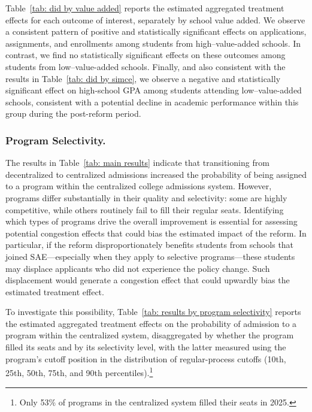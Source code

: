 \documentclass[11pt]{article}
\begin{document}
Table~\ref{tab: did by value added} reports the estimated aggregated treatment effects for each outcome of interest, separately by school value added. We observe a consistent pattern of positive and statistically significant effects on applications, assignments, and enrollments among students from high--value-added schools. In contrast, we find no statistically significant effects on these outcomes among students from low--value-added schools. Finally, and also consistent with the results in Table~\ref{tab: did by simce}, we observe a negative and statistically significant effect on high-school GPA among students attending low--value-added schools, consistent with a potential decline in academic performance within this group during the post-reform period.



\subsubsection{Program Selectivity.} 
The results in Table~\ref{tab: main results} indicate that transitioning from decentralized to centralized admissions increased the probability of being assigned to a program within the centralized college admissions system. However, programs differ substantially in their quality and selectivity: some are highly competitive, while others routinely fail to fill their regular seats. Identifying which types of programs drive the overall improvement is essential for assessing potential congestion effects that could bias the estimated impact of the reform. In particular, if the reform disproportionately benefits students from schools that joined SAE---especially when they apply to selective programs---these students may displace applicants who did not experience the policy change. Such displacement would generate a congestion effect that could upwardly bias the estimated treatment effect.

To investigate this possibility, Table~\ref{tab: results by program selectivity} reports the estimated aggregated treatment effects on the probability of admission to a program within the centralized system, disaggregated by whether the program filled its seats and by its selectivity level, with the latter measured using the program's cutoff position in the distribution of regular-process cutoffs (10th, 25th, 50th, 75th, and 90th percentiles).\footnote{Only 53\% of programs in the centralized system filled their seats in 2025.}


\end{document}
